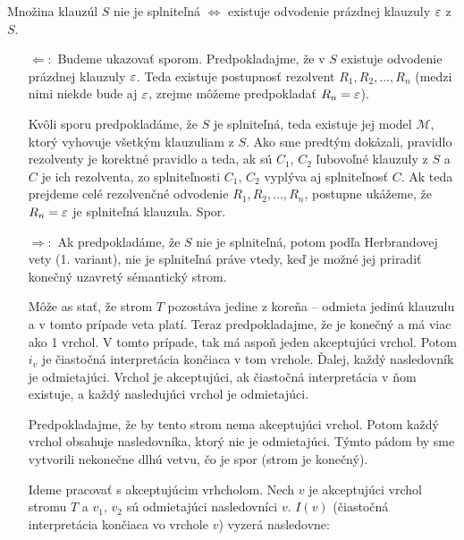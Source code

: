\begin{veta} 
    Množina klauzúl $S$ nie je splniteľná $\iff$ 
    existuje odvodenie prázdnej klauzuly $\varepsilon$ z $S$.
\end{veta}

\begin{dokaz}
\noindent
    \begin{itemize}
    \item[$\Leftarrow:$]
    Budeme ukazovať sporom.
    Predpokladajme, že v $S$ existuje odvodenie prázdnej klauzuly $\varepsilon$. 
    Teda existuje postupnosť rezolvent $R_1, R_2, \dots, R_n$ 
    (medzi nimi niekde bude aj $\varepsilon$, zrejme môžeme predpokladať
    $R_n = \varepsilon$).

    Kvôli sporu predpokladáme, že $S$ je splniteľná, 
    teda existuje jej model $\mathcal{M}$, ktorý
    vyhovuje všetkým klauzuliam z $S$. Ako sme predtým dokázali,
    pravidlo rezolventy je korektné pravidlo a teda, ak sú
    $C_1$, $C_2$ ľubovoľné klauzuly z $S$ a $C$ je ich rezolventa,
    zo splniteľnosti $C_1$, $C_2$ vyplýva aj splniteľnosť $C$.
    Ak teda prejdeme celé rezolvenčné odvodenie $R_1,R_2,\dots,R_n$,
    postupne ukážeme, že $R_n=\varepsilon$ je splniteľná klauzula. Spor.

\startFIXME
    \item[$\Rightarrow:$] Ak
predpokladáme, že $S$ nie je splniteľná, potom podľa Herbrandovej vety (1.
variant), nie je splniteľná práve vtedy, keď je možné jej priradiť konečný
uzavretý sémantický strom. 

\par Môže as stať, že strom $T$ pozostáva jedine z koreňa -- odmieta jedinú
klauzulu a v tomto prípade veta platí. Teraz predpokladajme, že je konečný a má
viac ako 1 vrchol. V tomto prípade, tak má aspoň jeden akceptujúci vrchol. Potom
$i_v$ je čiastočná interpretácia končiaca v tom vrchole. Ďalej, každý
nasledovník je odmietajúci. Vrchol je akceptujúci, ak čiastočná interpretácia v
ňom existuje, a každý nasledujúci vrchol je odmietajúci.

\par Predpokladajme, že by tento strom nema akceptujúci vrchol. Potom každý
vrchol obsahuje nasledovníka, ktorý nie je odmietajúci. Týmto pádom by sme
vytvorili nekonečne dlhú vetvu, čo je spor (strom je konečný).

\par Ideme pracovať s akceptujúcim vrhcholom. Nech $v$ je akceptujúci vrchol
stromu $T$ a $v_1$, $v_2$ sú odmietajúci nasledovníci $v$. $I(v)$ (čiastočná
interpretácia končiaca vo vrchole $v$) vyzerá nasledovne:


\end{itemize}
\end{dokaz}
